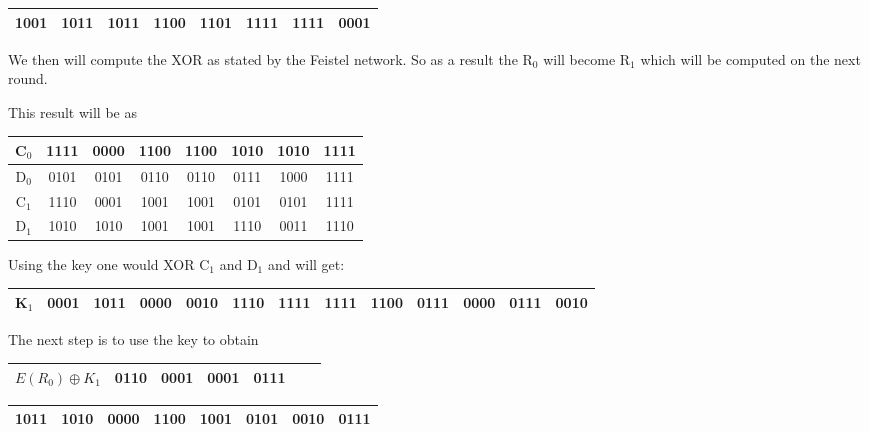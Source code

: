 \documentclass[11pt,a4paper]{report}
\begin{document}
\begin{center}
\begin{tabular}{|c|c|c|c|c|c|c|c|} \hline
1001 & 1011 & 1011 & 1100 & 1101 & 1111 & 1111 & 0001\\ \hline
\end{tabular}\newline
\end{center}
We then will compute the XOR as stated by the Feistel network. So as a result the R$_{0}$ will become R$_{1}$ which will be computed on the next round.

This result will be as

\begin{center}
\begin{tabular}{|c|c|c|c|c|c|c|c|} \hline
C$_{0}$ & 1111 & 0000 & 1100 & 1100 & 1010 & 1010 & 1111\\ \hline
D$_{0}$ & 0101 & 0101 & 0110 & 0110 & 0111 & 1000 & 1111\\ \hline
C$_{1}$ & 1110 & 0001 & 1001 & 1001 & 0101 & 0101 & 1111\\ \hline
D$_{1}$ & 1010 & 1010 & 1001 & 1001 & 1110 & 0011 & 1110\\ \hline
\end{tabular}\newline
\end{center}

Using the key one would XOR C$_{1}$ and D$_{1}$ and will get:

\begin{center}
\begin{tabular}{|c|c|c|c|c|c|c|c|c|c|c|c|c|}\hline
K$_{1}$ & 0001 & 1011 & 0000 & 0010 & 1110 & 1111 & 1111 & 1100 & 0111 & 0000 & 0111 & 0010\\ \hline
\end{tabular}\newline
\end{center}

The next step is to use the key to obtain\newline

\begin{tabular}{|c|c|c|c|c|c|c|}\hline
$E(R_{0}) \oplus K_{1}$ & 0110 & 0001 & 0001 & 0111 \\ \hline
\end{tabular}

\indent \begin{tabular}{|c|c||c|c|c|c|c|c|}\hline
1011 & 1010 & 0000 & 1100 & 1001 & 0101 & 0010 & 0111\\ \hline
\end{tabular}\newline
\end{document}
